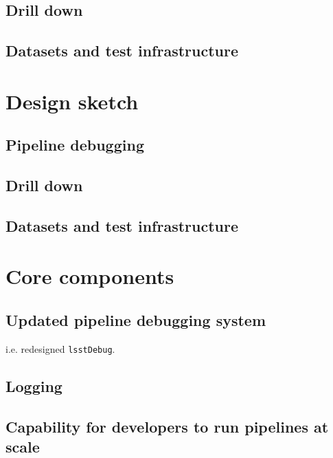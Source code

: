 \documentclass[DM,authoryear,toc,lsstdraft]{lsstdoc}
\begin{document}
\subsection{Drill down}


\subsection{Datasets and test infrastructure}


\section{Design sketch}

\subsection{Pipeline debugging}


\subsection{Drill down}


\subsection{Datasets and test infrastructure}


\section{Core components}

\subsection{Updated pipeline debugging system}


i.e. redesigned \texttt{lsstDebug}.

\subsection{Logging}


\subsection{Capability for developers to run pipelines at scale}
\end{document}

